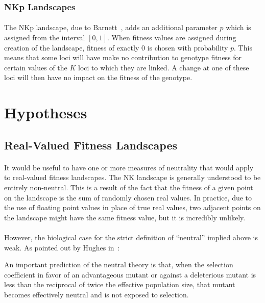 \documentclass[12pt,letterpaper,titlepage]{article}
\begin{document}
\subsubsection{NKp Landscapes}

\paragraph{}
The NKp landscape, due to Barnett~\cite{Barnett1998}, adds an additional
parameter $p$ which is assigned from the interval $\left[0,1\right]$. When
fitness values are assigned during creation of the landscape, fitness of
exactly 0 is chosen with probability $p$. This means that some loci will have
make no contribution to genotype fitness for certain values of the $K$ loci to
which they are linked. A change at one of these loci will then have no impact
on the fitness of the genotype.

\section{Hypotheses}

\subsection{Real-Valued Fitness Landscapes}

\paragraph{}
It would be useful to have one or more measures of neutrality that would apply
to real-valued fitness landscapes. The NK landscape is generally understood to
be entirely non-neutral. This is a result of the fact that the fitness of a
given point on the landscape is the sum of randomly chosen real values. In
practice, due to the use of floating point values in place of true real values,
two adjacent points on the landscape might have the same fitness value, but it
is incredibly unlikely.

\paragraph{}
However, the biological case for the strict definition of ``neutral'' implied
above is weak. As pointed out by Hughes in~\cite{Hughes2007}:

\begin{displayquote}
An important prediction of the neutral theory is that, when the selection
coefficient in favor of an advantageous mutant or against a deleterious mutant
is less than the reciprocal of twice the effective population size, that mutant
becomes effectively neutral and is not exposed to selection.
\end{displayquote}
\end{document}
